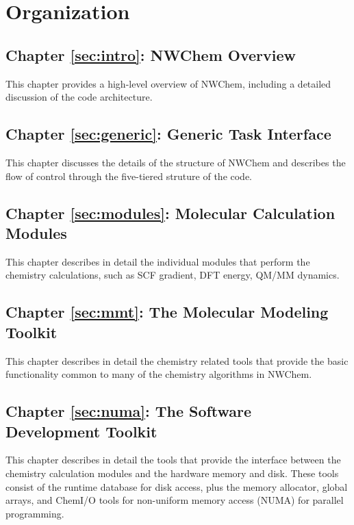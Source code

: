 \section*{Organization}

\subsection*{Chapter \ref{sec:intro}: NWChem Overview}

This chapter provides a high-level overview of NWChem, including a detailed
discussion of the code architecture.  

\subsection*{Chapter \ref{sec:generic}: Generic Task Interface}

This chapter discusses the details of the structure of NWChem
and describes the flow of control through the five-tiered struture
of the code.

\subsection*{Chapter \ref{sec:modules}:  Molecular Calculation Modules}

This chapter describes in detail the individual modules that perform the chemistry
calculations, such as SCF gradient, DFT energy, QM/MM dynamics.

\subsection*{Chapter \ref{sec:mmt}: The Molecular Modeling Toolkit}

This chapter describes in detail the chemistry related tools that provide the basic 
functionality common to many of the chemistry algorithms in NWChem.

\subsection*{Chapter \ref{sec:numa}: The Software Development Toolkit}

This chapter describes in detail the tools that provide the interface between
the chemistry calculation modules and the hardware memory and disk.  These tools 
consist of the runtime database for disk access, plus the memory allocator, 
global arrays, and ChemI/O tools
for  non-uniform memory access (NUMA) for parallel programming.

